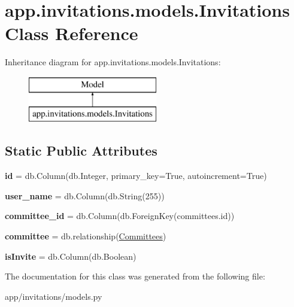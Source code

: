 \hypertarget{classapp_1_1invitations_1_1models_1_1_invitations}{}\section{app.\+invitations.\+models.\+Invitations Class Reference}
\label{classapp_1_1invitations_1_1models_1_1_invitations}
Inheritance diagram for app.\+invitations.\+models.\+Invitations\+:\begin{figure}[H]
\begin{center}
\leavevmode
\includegraphics[height=2.000000cm]{classapp_1_1invitations_1_1models_1_1_invitations}
\end{center}
\end{figure}
\subsection*{Static Public Attributes}
\begin{DoxyCompactItemize}
\item 
\mbox{\label{classapp_1_1invitations_1_1models_1_1_invitations_a0eb799f4087b5e18e7522b37a23066a1}} 
{\bfseries id} = db.\+Column(db.\+Integer, primary\+\_\+key=True, autoincrement=True)
\item 
\mbox{\label{classapp_1_1invitations_1_1models_1_1_invitations_aaa400730c8069ee7cfc19e4cd7dd85fb}} 
{\bfseries user\+\_\+name} = db.\+Column(db.\+String(255))
\item 
\mbox{\label{classapp_1_1invitations_1_1models_1_1_invitations_a85959c0ec548e4fb861e8d760df34b80}} 
{\bfseries committee\+\_\+id} = db.\+Column(db.\+Foreign\+Key(\textquotesingle{}committees.\+id\textquotesingle{}))
\item 
\mbox{\label{classapp_1_1invitations_1_1models_1_1_invitations_ad1460453cca5b85ddf1fd094359919c0}} 
{\bfseries committee} = db.\+relationship(\mbox{\hyperlink{classapp_1_1committees_1_1models_1_1_committees}{Committees}})
\item 
\mbox{\label{classapp_1_1invitations_1_1models_1_1_invitations_a0458a9aa33004e79c5043090009da9f5}} 
{\bfseries is\+Invite} = db.\+Column(db.\+Boolean)
\end{DoxyCompactItemize}


The documentation for this class was generated from the following file\+:\begin{DoxyCompactItemize}
\item 
app/invitations/models.\+py\end{DoxyCompactItemize}
